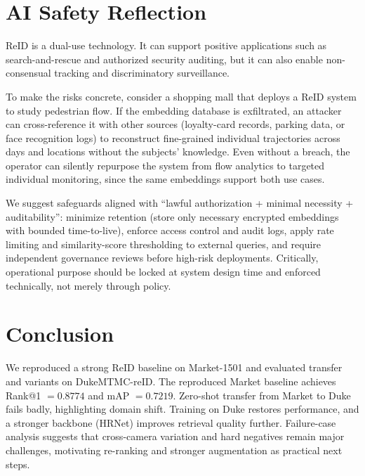 \documentclass[sigconf,nonacm]{acmart}
\begin{document}
\section{AI Safety Reflection}
ReID is a dual-use technology.
It can support positive applications such as search-and-rescue and authorized security auditing, but it can also enable non-consensual tracking and discriminatory surveillance.

To make the risks concrete, consider a shopping mall that deploys a ReID system to study pedestrian flow.
If the embedding database is exfiltrated, an attacker can cross-reference it with other sources (loyalty-card records, parking data, or face recognition logs) to reconstruct fine-grained individual trajectories across days and locations without the subjects' knowledge.
Even without a breach, the operator can silently repurpose the system from flow analytics to targeted individual monitoring, since the same embeddings support both use cases.

We suggest safeguards aligned with ``lawful authorization + minimal necessity + auditability'': minimize retention (store only necessary encrypted embeddings with bounded time-to-live), enforce access control and audit logs, apply rate limiting and similarity-score thresholding to external queries, and require independent governance reviews before high-risk deployments.
Critically, operational purpose should be locked at system design time and enforced technically, not merely through policy.

\section{Conclusion}
We reproduced a strong ReID baseline on Market-1501 and evaluated transfer and variants on DukeMTMC-reID.
The reproduced Market baseline achieves Rank@1 $=0.8774$ and mAP $=0.7219$.
Zero-shot transfer from Market to Duke fails badly, highlighting domain shift.
Training on Duke restores performance, and a stronger backbone (HRNet) improves retrieval quality further.
Failure-case analysis suggests that cross-camera variation and hard negatives remain major challenges, motivating re-ranking and stronger augmentation as practical next steps.

{\small


}
\end{document}
